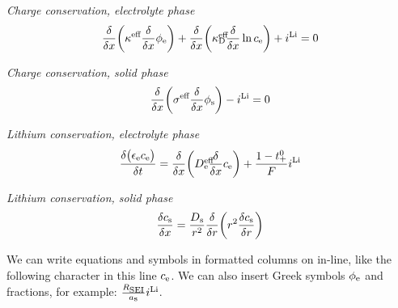 \documentclass[pdftex,12pt,a4paper]{article}
\def\SPSB#1#2{\rlap{\textsuperscript{\textcolor{black}{#1}}}\SB{#2}}
\def\SB#1{\textsubscript{\textcolor{black}{#1}}}
\begin{document}

\begin{multicols}{2}
	\begin{center}
	
	\textit{Charge conservation, electrolyte phase}
	\begin{equation}\label{eq:charge_cons_elec_phase}
	\frac{\delta}{\delta x}\bigg(\kappa\textsuperscript{eff}\frac{\delta}{\delta x}\phi\textsubscript{e}\bigg)+\frac{\delta}{\delta x}\bigg(\kappa\SPSB{eff}{D}\frac{\delta}{\delta x}\ln c\textsubscript{e}\bigg)+i\textsuperscript{Li}=0
	\end{equation}
	
	\textit{Charge conservation, solid phase}
	\begin{equation}\label{eq:charge_cons_solid_phase}
	\frac{\delta}{\delta x}\bigg(\sigma\textsuperscript{eff}\frac{\delta}{\delta x}\phi\textsubscript{s}\bigg)-i\textsuperscript{Li}=0
	\end{equation}
	
	\textit{Lithium conservation, electrolyte phase}
	\begin{equation}\label{eq:species_cons_elec_phase}
	\frac{\delta\big(\epsilon\textsubscript{e}c\textsubscript{e}\big)}{\delta t} = \frac{\delta}{\delta x}\bigg(D\SPSB{eff}{e}\frac{\delta}{\delta x}c\textsubscript{e}\bigg)+\frac{1-t\SPSB{0}{+}}{F}i\textsuperscript{Li}
	\end{equation}
	
	\textit{Lithium conservation, solid phase}
	\begin{equation}\label{eq:species_cons_solid_phase}
	\frac{\delta c\textsubscript{s}}{\delta x} = \frac{D\textsubscript{s}}{r\textsuperscript{2}}\frac{\delta}{\delta r}\bigg(r\textsuperscript{2}\frac{\delta c\textsubscript{s}}{\delta r}\bigg)
	\end{equation}
	
	\end{center}
\end{multicols}


We can write equations and symbols in formatted columns on in-line, like the following character in this line $c\textsubscript{e}$. We can also insert Greek symbols $\phi\textsubscript{e}$ and fractions, for example: $\frac{R\textsubscript{SEI}}{a\textsubscript{s}}i\textsuperscript{Li}$.

\end{document}
